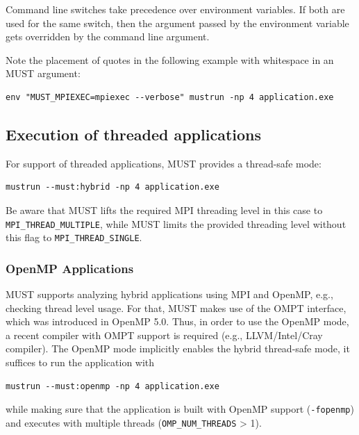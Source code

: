 \documentclass[english]{scrartcl}
\begin{document}
Command line switches take precedence over environment variables.
If both are used for the same switch, then the argument passed by the environment variable gets overridden by the command line argument.

Note the placement of quotes in the following example with whitespace in an MUST argument:
\begin{verbatim}
env "MUST_MPIEXEC=mpiexec --verbose" mustrun -np 4 application.exe
\end{verbatim}


\subsection{Execution of threaded applications}
\label{section:threaded_apps}
For support of threaded applications, MUST provides a thread-safe mode:
\begin{verbatim}
mustrun --must:hybrid -np 4 application.exe
\end{verbatim}
Be aware that MUST lifts the required MPI threading level in this case to
\texttt{MPI\_THREAD\_MULTIPLE}, while MUST limits the provided threading level without
this flag to \texttt{MPI\_THREAD\_SINGLE}.

\subsubsection{OpenMP Applications}
MUST supports analyzing hybrid applications using MPI and OpenMP, e.g., checking thread level usage.
For that, MUST makes use of the OMPT interface, which was introduced in OpenMP 5.0.
Thus, in order to use the OpenMP mode, a recent compiler with OMPT support is required (e.g., LLVM/Intel/Cray compiler).
The OpenMP mode implicitly enables the hybrid thread-safe mode, it suffices to run the application with
\begin{verbatim}
mustrun --must:openmp -np 4 application.exe
\end{verbatim}
while making sure that the application is built with OpenMP support (\texttt{-fopenmp}) and executes with multiple threads (\texttt{OMP\_NUM\_THREADS} > 1).
\end{document}

